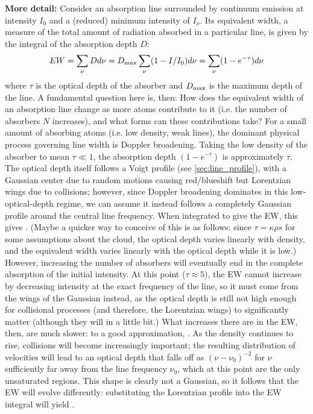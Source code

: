 \textbf{More detail:}\newline
Consider an absorption line surrounded by continuum emission at intensity $I_{0}$ and a (reduced) minimum intensity of $I_{\nu}$. Its equivalent width, a measure of the total amount of radiation absorbed in a particular line, is given by the integral of the absorption depth $D$:
\begin{equation}
    EW = \sum_{\nu}D d\nu = D_{\rm max}\sum_{\nu}(1-I/I_{0})d\nu=\sum_{\nu}(1-e^{-\tau})d\nu
\end{equation}
where $\tau$ is the optical depth of the absorber and $D_{\rm  max}$ is the maximum depth of the line. A fundamental question here is, then: How does the equivalent width of an absorption line change as more atoms contribute to it (i.e. the number of absorbers $N$ increases), and what forms can these contributions take?\newline
For a small amount of absorbing atoms (i.e. low density, weak lines), the dominant physical process governing line width is Doppler broadening. Taking the low density of the absorber to mean $\tau \ll 1$, the absorption depth $(1-e^{-\tau})$ is approximately $\tau$. The optical depth itself follows a Voigt profile (see \ref{sec:line_profile}), with a Gaussian center due to random motions causing red/blueshift but Lorentzian wings due to collisions; however, since Doppler broadening dominates in this low-optical-depth regime, we can assume it instead follows a completely Gaussian profile around the central line frequency. When integrated to give the EW, this gives . (Maybe a quicker way to conceive of this is as follows: since $\tau=\kappa\rho s$ for some assumptions about the cloud, the optical depth varies linearly with density, and the equivalent width varies linearly with the optical depth while it is low.)\newline
However, increasing the number of absorbers will eventually end in the complete absorption of the initial intensity. At this point ($\tau\approx 5$), the EW cannot increase by decreasing intensity at the exact frequency of the line, so it must come from the wings of the Gaussian instead, as the optical depth is still not high enough for collisional processes (and therefore, the Lorentzian wings) to significantly matter (although they will in a little bit.) What increases there are in the EW, then, are much slower: to a good approximation, .\newline
As the density continues to rise, collisions will become increasingly important; the resulting distribution of velocities will lead to an optical depth that falls off as $(\nu-\nu_{0})^{-2}$ for $\nu$ sufficiently far away from the line frequency $\nu_{0}$, which at this point are the only unsaturated regions. This shape is clearly not a Gaussian, so it follows that the EW will evolve differently: substituting the Lorentzian profile into the EW integral will yield .